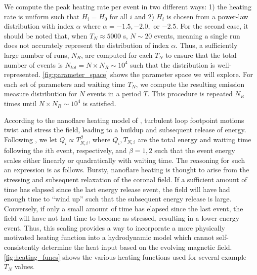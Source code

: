 \documentclass[apj]{emulateapj}
\begin{document}
	\par We compute the peak heating rate per event in two different ways: 1) the heating rate is uniform such that $H_i=H_0$ for all $i$ and 2) $H_i$ is chosen from a power-law distribution with index $\alpha$ where $\alpha=-1.5,-2.0,$ or $-2.5$. For the second case, it should be noted that, when $T_N\approx5000$ s, $N\sim20$ events, meaning a single run does not accurately represent the distribution of index $\alpha$. Thus, a sufficiently large number of runs, $N_{R}$, are computed for each $T_N$ to ensure that the total number of events is $N_{tot}=N\times N_{R}\sim10^4$ such that the distribution is well-represented. \autoref{fig:parameter_space} shows the parameter space we will explore. For each set of parameters and waiting time $T_N$, we compute the resulting emission measure distribution for $N$ events in a period $T$. This procedure is repeated $N_R$ times until $N\times N_R\sim10^4$ is satisfied.
	\par According to the nanoflare heating model of \citet{parker_nanoflares_1988}, turbulent loop footpoint motions twist and stress the field, leading to a buildup and subsequent release of energy. Following \citet{cargill_active_2014}, we let $Q_i\propto T_{N,i}^{\beta}$, where $Q_i,T_{N,i}$ are the total energy and waiting time following the $i$th event, respectively, and $\beta=1,2$ such that the event energy scales either linearly or quadratically with waiting time. The reasoning for such an expression is as follows. Bursty, nanoflare heating is thought to arise from the stressing and subsequent relaxation of the coronal field. If a sufficient amount of time has elapsed since the last energy release event, the field will have had enough time to ``wind up'' such that the subsequent energy release is large. Conversely, if only a small amount of time has elapsed since the last event, the field will have not had time to become as stressed, resulting in a lower energy event. Thus, this scaling provides a way to incorporate a more physically motivated heating function into a hydrodynamic model which cannot self-consistently determine the heat input based on the evolving magnetic field. \autoref{fig:heating_funcs} shows the various heating functions used for several example $T_N$ values.
\end{document}
